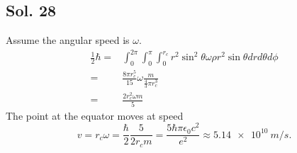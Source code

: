    \subsection*{Sol. 28}
   Assume the angular speed is $\omega.$
   \begin{align*}
       \frac{1}{2}\hbar = 
       &\int_0^{2\pi}\int_{0}^\pi\int_0^{r_c} 
       r^2\sin^2\theta\omega
       \rho
       r^2\sin\theta drd\theta d\phi\\
       =&\frac{8\pi r_c^5}{15}\omega 
       \frac{m}{\frac{4}{3}\pi r_c^3}\\
       =&\frac{2r_c^2\omega m}{5}
   \end{align*}
   The point at the equator moves at speed
   $$
   v = r_c\omega = 
   \frac{\hbar}{2}
   \frac{5}{2r_c m}
   =\frac{5\hbar\pi\epsilon_0c^2}{e^2}\approx \qty{5.14e10}{m/s}.
   $$
